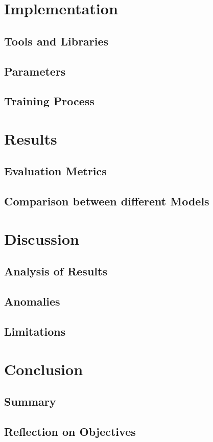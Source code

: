\documentclass[12pt]{report}
\begin{document}
\chapter{Implementation}
\section{Tools and Libraries}
\section{Parameters}
\section{Training Process}

\chapter{Results}
\section{Evaluation Metrics}
\section{Comparison between different Models}

\chapter{Discussion}
\section{Analysis of Results}
\section{Anomalies}
\section{Limitations}

\chapter{Conclusion}
\section{Summary}
\section{Reflection on Objectives}
\end{document}
